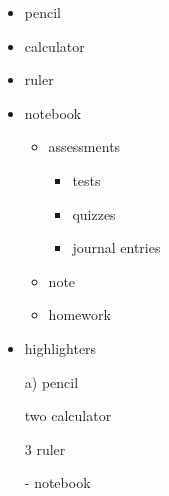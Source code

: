 \documentclass[11pt]{article}
\begin{document}
\begin{itemize}
\item pencil
\item calculator
\item ruler
\item notebook
	\begin{itemize}
	\item assessments
		\begin{itemize}
		\item tests
		\item quizzes
		\item journal entries
		\end{itemize}
	\item note
	\item homework
	\end{itemize}
\item highlighters
\end{itemize}

\vspace{1cm}

\begin{enumerate}
\item[a)] pencil
\item[two] calculator
\item[3] ruler
\item[-] notebook
\end{enumerate}
\end{document}
